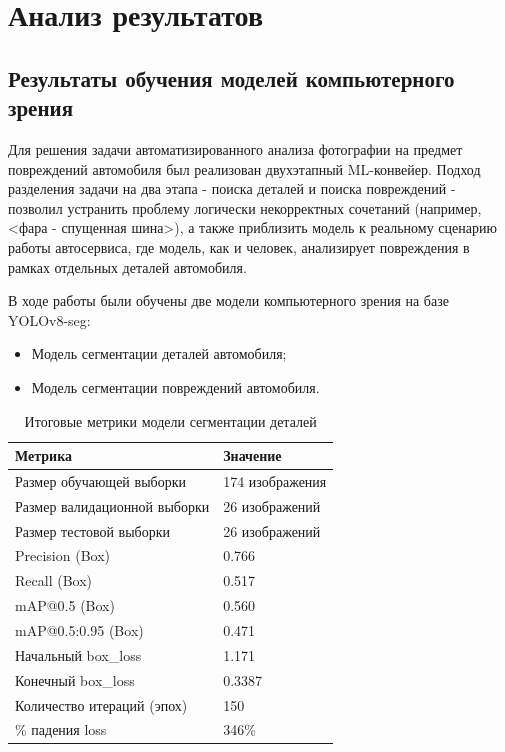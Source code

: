\chapter{Анализ результатов}\label{ch:7}

\section{Результаты обучения моделей компьютерного зрения}

Для решения задачи автоматизированного анализа фотографии на предмет повреждений автомобиля был реализован двухэтапный ML-конвейер. Подход разделения задачи на два этапа - поиска деталей и поиска повреждений - позволил устранить проблему логически некорректных сочетаний (например, <фара - спущенная шина>), а также приблизить модель к реальному сценарию работы автосервиса, где модель, как и человек, анализирует повреждения в рамках отдельных деталей автомобиля.

В ходе работы были обучены две модели компьютерного зрения на базе YOLOv8-seg:

\begin{itemize}
    \item Модель сегментации деталей автомобиля;
    \item Модель сегментации повреждений автомобиля.
\end{itemize}


\begin{table}[H]
\centering
\caption{Итоговые метрики модели сегментации деталей}
\begin{tabular}{|l|l|}
\hline
\textbf{Метрика} & \textbf{Значение} \\
\hline
Размер обучающей выборки     & 174 изображения \\
\hline
Размер валидационной выборки & 26 изображений \\
\hline
Размер тестовой выборки      & 26 изображений \\
\hline
Precision (Box)              & 0.766 \\
\hline
Recall (Box)                 & 0.517 \\
\hline
mAP@0.5 (Box)                & 0.560 \\
\hline
mAP@0.5:0.95 (Box)           & 0.471 \\
\hline
Начальный box\_loss          & 1.171 \\
\hline
Конечный box\_loss           & 0.3387 \\
\hline
Количество итераций (эпох)   & 150 \\
\hline
\% падения loss              & 346\% \\
\hline
\end{tabular}
\end{table}

